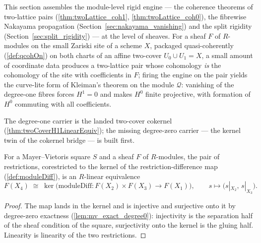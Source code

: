This section assembles the module-level rigid engine --- the coherence theorems of
two-lattice pairs (\ref{thm:twoLattice_coh1}, \ref{thm:twoLattice_coh0}), the fibrewise
Nakayama propagation (Section~\ref{sec:nakayama_vanishing}) and the split rigidity
(Section~\ref{sec:split_rigidity}) --- at the level of sheaves. For a sheaf \(F\) of
\(R\)-modules on the small Zariski site of a scheme \(X\), packaged quasi-coherently
(\ref{def:qcohOn}) on both charts of an affine two-cover \(U_0 \cup U_1 = X\), a small
amount of coordinate data produces a two-lattice pair whose cohomology \emph{is} the
cohomology of the site with coefficients in \(F\); firing the engine on the pair yields
the curve-lite form of Kleiman's theorem on the module \(\mathcal Q\): vanishing of the
degree-one fibres forces \(H^1 = 0\) and makes \(H^0\) finite projective, with formation
of \(H^0\) commuting with all coefficients.

The degree-one carrier is the landed two-cover cokernel
(\ref{thm:twoCoverH1LinearEquiv}); the missing degree-zero carrier --- the kernel twin of
the cokernel bridge --- is built first.

\begin{theorem}
  \label{thm:sectionsKerEquiv}
  \leanok
  For a Mayer--Vietoris square \(S\) and a sheaf \(F\) of \(R\)-modules, the pair of
  restrictions, corestricted to the kernel of the restriction-difference map
  (\ref{def:moduleDiff}), is an \(R\)-linear equivalence
  \[
    F(X_4) \;\cong\; \ker\bigl(\mathrm{moduleDiff} : F(X_2) \times F(X_3) \to
      F(X_1)\bigr),
    \qquad s \longmapsto \bigl(s|_{X_2},\, s|_{X_3}\bigr).
  \]
\end{theorem}
\begin{proof}
  \leanok
  The map lands in the kernel and is injective and surjective onto it by degree-zero
  exactness (\ref{lem:mv_exact_degree0}): injectivity is the separation half of the
  sheaf condition of the square, surjectivity onto the kernel is the gluing half.
  Linearity is linearity of the two restrictions.
\end{proof}


